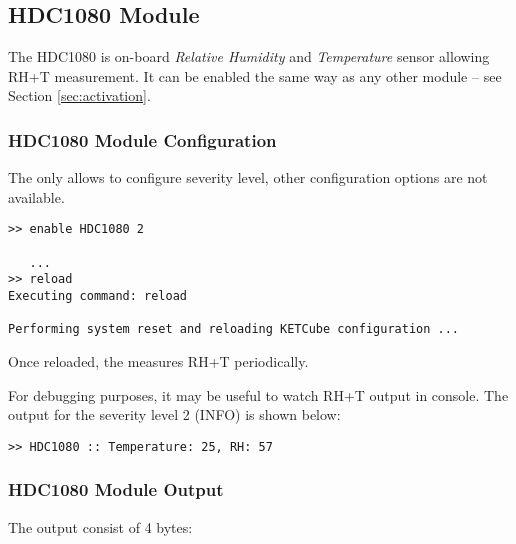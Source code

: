   

\clearpage
\subsection{HDC1080 Module}

The HDC1080 is on-board {\it Relative Humidity} and {\it Temperature} sensor allowing RH+T measurement. It can be enabled the same way as any other module -- see Section \ref{sec:activation}.

\subsubsection{HDC1080 Module Configuration}
  The  only allows to configure severity level, other configuration options are not available.
  
\begin{docCodeExample}
\begin{verbatim}
>> enable HDC1080 2

   ...
>> reload
Executing command: reload

Performing system reset and reloading KETCube configuration ...  
\end{verbatim}
\end{docCodeExample}
  
  Once reloaded, the  measures RH+T periodically. 
  
  For debugging purposes, it may be useful to watch RH+T output in console. The output for the severity level 2 (INFO) is shown below:

\begin{docCodeExample}
\begin{verbatim}
>> HDC1080 :: Temperature: 25, RH: 57
\end{verbatim}
\end{docCodeExample}

\subsubsection{HDC1080 Module Output}
  The  output consist of 4 bytes:
  

